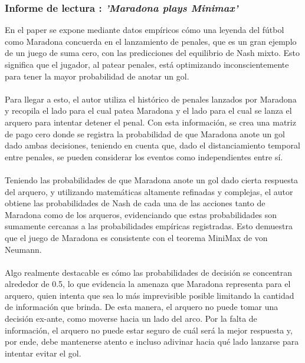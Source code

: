 \documentclass[12pt]{article}
\begin{document}
\subsubsection{Informe de lectura \citet{palacios-huerta_2023}: \textit{'Maradona plays Minimax'}}
\begin{flushleft}
    En el paper se expone mediante datos empíricos cómo una leyenda del fútbol como Maradona concuerda en el lanzamiento de penales, que es un gran ejemplo de un juego de suma cero, con las predicciones del equilibrio de Nash mixto. Esto significa que el jugador, al patear penales, está optimizando inconscientemente para tener la mayor probabilidad de anotar un gol.\\~\\
    Para llegar a esto, el autor utiliza el histórico de penales lanzados por Maradona y recopila el lado para el cual patea Maradona y el lado para el cual se lanza el arquero para intentar detener el penal. Con esta información, se crea una matriz de pago cero donde se registra la probabilidad de que Maradona anote un gol dado ambas decisiones, teniendo en cuenta que, dado el distanciamiento temporal entre penales, se pueden considerar los eventos como independientes entre sí.\\~\\
    Teniendo las probabilidades de que Maradona anote un gol dado cierta respuesta del arquero, y utilizando matemáticas altamente refinadas y complejas, el autor obtiene las probabilidades de Nash de cada una de las acciones tanto de Maradona como de los arqueros, evidenciando que estas probabilidades son sumamente cercanas a las probabilidades empíricas registradas. Esto demuestra que el juego de Maradona es consistente con el teorema MiniMax de von Neumann.\\~\\
    Algo realmente destacable es cómo las probabilidades de decisión se concentran alrededor de 0.5, lo que evidencia la amenaza que Maradona representa para el arquero, quien intenta que sea lo más imprevisible posible limitando la cantidad de información que brinda. De esta manera, el arquero no puede tomar una decisión ex-ante, como moverse hacia un lado del arco. Por la falta de información, el arquero no puede estar seguro de cuál será la mejor respuesta y, por ende, debe mantenerse atento e incluso adivinar hacia qué lado lanzarse para intentar evitar el gol.
\end{flushleft}
\end{document}
